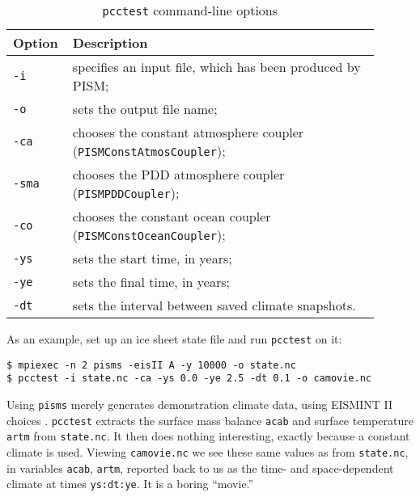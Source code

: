 \begin{table}[ht]
  \caption{\texttt{pcctest} command-line options}
  \centering
  \begin{tabular}{p{0.1\linewidth}p{0.8\linewidth}}\hline
    \textbf{Option} & \textbf{Description}\\
    \hline
    \texttt{-i} & specifies an input file, which has been produced by PISM;\\
    \texttt{-o} & sets the output file name;\\
    \texttt{-ca} &chooses the constant atmosphere coupler (\verb|PISMConstAtmosCoupler|);\\
    \texttt{-sma} & chooses the PDD atmosphere coupler (\verb|PISMPDDCoupler|);\\
    \texttt{-co} & chooses the constant ocean coupler (\verb|PISMConstOceanCoupler|);\\
    \texttt{-ys} & sets the start time, in years;\\
    \texttt{-ye} & sets the final time, in years;\\
    \texttt{-dt} & sets the interval between saved climate snapshots.\\
    \hline
 \end{tabular}
 \label{tab:pcctest}
\end{table}

\bigskip
As an example, set up an ice sheet state file and run \verb|pcctest| on it:
\begin{verbatim}
$ mpiexec -n 2 pisms -eisII A -y 10000 -o state.nc
$ pcctest -i state.nc -ca -ys 0.0 -ye 2.5 -dt 0.1 -o camovie.nc
\end{verbatim}
Using \verb|pisms| merely generates demonstration climate data, using
EISMINT II choices \cite{EISMINT00}.  \verb|pcctest| extracts the 
surface mass balance \verb|acab| and surface temperature \verb|artm| from \verb|state.nc|.
It then does nothing interesting, exactly because a constant climate
is used.  Viewing \verb|camovie.nc| we see these same values as from \verb|state.nc|,
in variables \verb|acab|, \verb|artm|, reported back to us as the time- and space-dependent
climate at times \verb|ys:dt:ye|.  It is a boring ``movie.''

